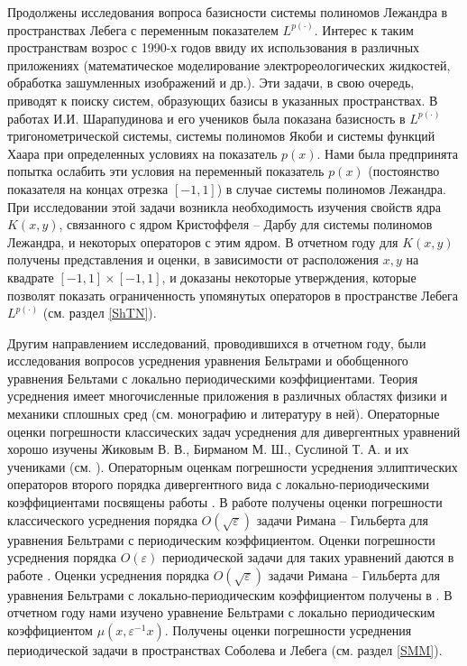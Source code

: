 Продолжены исследования вопроса базисности системы полиномов Лежандра в пространствах Лебега с переменным показателем $L^{p(\cdot)}$. Интерес к таким пространствам возрос с 1990-х годов ввиду их использования в различных приложениях (математическое моделирование электрореологических жидкостей, обработка зашумленных изображений и др.). Эти задачи, в свою очередь, приводят к поиску систем, образующих базисы в указанных пространствах. В работах И.И. Шарапудинова и его учеников \cite{tad-SHII-Haar,tad-SHII-AnalisysMath,tad-SHII-Leg,tad-MMG-Haar,tad-SHII-Jacob,tad-SHII-Ult,tad-RAM-Jacob} была показана базисность в $L^{p(\cdot)}$  тригонометрической системы, системы полиномов Якоби и системы функций Хаара при определенных условиях на показатель $p(x)$.
Нами была предпринята попытка ослабить эти условия на переменный показатель $p(x)$ (постоянство показателя на концах отрезка $[-1,1]$) в случае системы полиномов Лежандра. При исследовании этой задачи возникла необходимость изучения свойств ядра $K(x,y)$, связанного с ядром Кристоффеля -- Дарбу для системы полиномов Лежандра, и некоторых операторов с этим ядром. В отчетном году для $K(x,y)$ получены представления и оценки, в зависимости от расположения $x,y$ на квадрате $[-1,1]\times[-1,1]$, и доказаны некоторые утверждения, которые позволят показать ограниченность упомянутых операторов в пространстве Лебега $L^{p(\cdot)}$ (см. раздел \ref{ShTN}).

Другим направлением исследований, проводившихся в отчетном году, были исследования вопросов усреднения уравнения Бельтрами и обобщенного уравнения Бельтами с локально периодическими коэффициентами. Теория усреднения имеет многочисленные приложения в различных областях физики и механики сплошных сред (см. монографию \cite{smm-1} и литературу в  ней). Операторные оценки погрешности классических задач усреднения для дивергентных уравнений хорошо изучены Жиковым В. В., Бирманом   М. Ш., Суслиной  Т. А. и их учениками (см. \cite{smm-2,smm-3}).
Операторным оценкам погрешности усреднения  эллиптических операторов второго порядка дивергентного вида  с локально-периодическими коэффициентами посвящены работы \cite{smm-4,smm-5,smm-6,smm-7}.
В работе \cite{smm-8} получены оценки погрешности классического усреднения порядка  $O(\sqrt\varepsilon)$ задачи Римана -- Гильберта  для уравнения Бельтрами с периодическим коэффициентом. Оценки погрешности усреднения порядка $O(\varepsilon)$ периодической задачи для таких уравнений даются в работе \cite{smm-9}.  Оценки усреднения  порядка $O(\sqrt\varepsilon)$  задачи Римана -- Гильберта для уравнения Бельтрами с локально-периодическим коэффициентом получены  в \cite{smm-10}. В отчетном году нами изучено уравнение Бельтрами с локально периодическим коэффициентом $\mu(x,\varepsilon^{-1} x)$. Получены оценки
погрешности усреднения периодической задачи в пространствах Соболева и Лебега (см. раздел \ref{SMM}).



